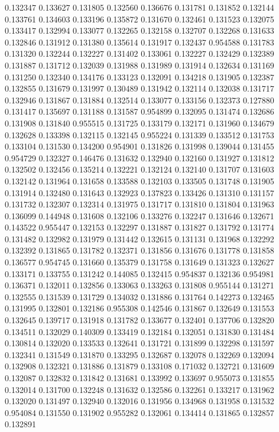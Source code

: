 0.132347
0.133627
0.131805
0.132560
0.136676
0.131781
0.131852
0.132144
0.133761
0.134603
0.133196
0.135872
0.131670
0.132461
0.131523
0.132075
0.133417
0.132994
0.133077
0.132265
0.132158
0.132707
0.132268
0.131633
0.132846
0.131912
0.131380
0.135614
0.131917
0.132437
0.954588
0.131783
0.131320
0.132244
0.132227
0.131402
0.133061
0.132227
0.132429
0.132389
0.131887
0.131712
0.132039
0.131988
0.131989
0.131914
0.132634
0.131169
0.131250
0.132340
0.134176
0.133123
0.132091
0.134218
0.131905
0.132387
0.132855
0.131679
0.131997
0.130489
0.131942
0.132114
0.132038
0.131717
0.132946
0.131867
0.131884
0.132514
0.133077
0.133156
0.132373
0.127880
0.131417
0.135697
0.131188
0.131587
0.954899
0.132095
0.131474
0.132686
0.131908
0.131840
0.955515
0.131725
0.133179
0.132171
0.131960
0.134679
0.132628
0.133398
0.132115
0.132145
0.955224
0.131339
0.133512
0.131753
0.133104
0.131530
0.134200
0.954901
0.131826
0.131998
0.139044
0.131455
0.954729
0.132327
0.146476
0.131632
0.132940
0.132160
0.131927
0.131812
0.132502
0.132456
0.135214
0.132221
0.132124
0.132140
0.131707
0.131603
0.132142
0.131964
0.131658
0.133588
0.132103
0.133505
0.131748
0.131905
0.131914
0.132480
0.131643
0.132923
0.137823
0.133426
0.131310
0.131157
0.131732
0.132307
0.132314
0.131975
0.131717
0.131810
0.131804
0.131963
0.136099
0.144948
0.131608
0.132106
0.133276
0.132247
0.131646
0.132671
0.143522
0.955447
0.132153
0.132297
0.131887
0.131827
0.131792
0.131774
0.131482
0.132982
0.131979
0.131442
0.132615
0.131131
0.131968
0.132292
0.132392
0.131865
0.131782
0.132371
0.131856
0.131676
0.131778
0.131858
0.136577
0.954745
0.131660
0.135379
0.131758
0.131649
0.131323
0.132627
0.133171
0.133755
0.131242
0.144085
0.132415
0.954837
0.132136
0.954981
0.136371
0.132011
0.132856
0.133063
0.133263
0.131808
0.955144
0.131271
0.132555
0.131539
0.131729
0.134032
0.131886
0.131764
0.142273
0.132465
0.131995
0.132801
0.132186
0.955308
0.142546
0.131867
0.132649
0.131553
0.132645
0.139717
0.131918
0.131782
0.133677
0.132401
0.137706
0.132820
0.134511
0.132029
0.140309
0.133419
0.132184
0.132051
0.131830
0.131484
0.130814
0.132020
0.133533
0.132641
0.131721
0.131899
0.132298
0.131597
0.132341
0.131549
0.131870
0.133295
0.132687
0.132078
0.132269
0.132094
0.132908
0.132321
0.131886
0.131879
0.133108
0.171032
0.132721
0.131609
0.132087
0.132832
0.131842
0.131681
0.133992
0.133697
0.955073
0.131855
0.132014
0.131700
0.132248
0.131632
0.132586
0.132261
0.133217
0.131962
0.132020
0.131497
0.132940
0.132016
0.131956
0.134968
0.131958
0.131532
0.954084
0.131550
0.131902
0.955282
0.132061
0.134414
0.131865
0.132857
0.132891

